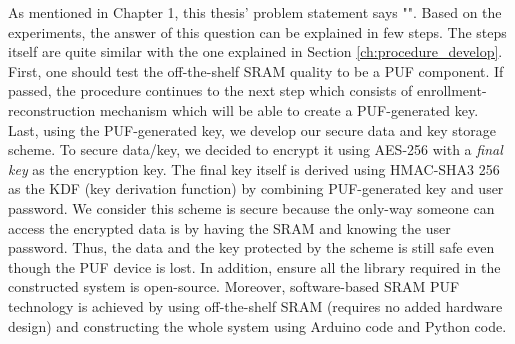 As mentioned in Chapter 1, this thesis' problem statement says "\problemStatement". Based on the experiments, the answer of this question can be explained in few steps.
The steps itself are quite similar with the one explained in Section \ref{ch:procedure_develop}.
First, one should test the off-the-shelf SRAM quality to be a PUF component. If passed, the procedure continues to the next step which consists of enrollment-reconstruction mechanism which will be able to create a PUF-generated key. Last, using the PUF-generated key, we develop our secure data and key storage scheme. To secure data/key, we decided to encrypt it using AES-256 with a \textit{final key} as the encryption key. The final key itself is derived using HMAC-SHA3 256 as the KDF (key derivation function) by combining PUF-generated key and user password. We consider this scheme is secure because the only-way someone can access the encrypted data is by having the SRAM and knowing the user password. Thus, the data and the key protected by the scheme is still safe even though the PUF device is lost.
In addition, ensure all the library required in the constructed system is open-source.
Moreover, software-based SRAM PUF technology is achieved by using off-the-shelf SRAM (requires no added hardware design) and constructing the whole system using Arduino code and Python code.

